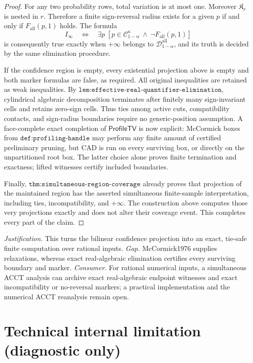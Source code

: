 \documentclass{article}
\begin{document}
\begin{proof}
For any two probability rows, total variation is at most one.  Moreover \(\mathfrak K_r\) is nested in \(r\).  Therefore a finite sign-reversal radius exists for a given \(p\) if and only if \(F_{\mathrm{all}}(p,1)\) holds.  The formula
\[
 I_{\infty}\quad\Longleftrightarrow\quad
 \exists p\;[p\in\mathcal C_{1-\alpha}^{\kappa}\ \wedge\ 
 \neg F_{\mathrm{all}}(p,1)]
\]
is consequently true exactly when \(+\infty\) belongs to \(\mathcal D_{1-\alpha}^{\mathrm{all}}\), and its truth is decided by the same elimination procedure.

If the confidence region is empty, every existential projection above is empty and both marker formulas are false, as required.  All original inequalities are retained as weak inequalities.  By \(\texttt{lem:effective-real-quantifier-elimination}\), cylindrical algebraic decomposition terminates after finitely many sign-invariant cells and retains zero-sign cells.  Thus ties among active cuts, compatibility contacts, and sign-radius boundaries require no generic-position assumption.  A face-complete exact completion of \(\mathsf{ProfileTV}\) is now explicit: McCormick boxes from \(\texttt{def:profiling-handle}\) may perform any finite amount of certified preliminary pruning, but CAD is run on every surviving box, or directly on the unpartitioned root box.  The latter choice alone proves finite termination and exactness; lifted witnesses certify included boundaries.

Finally, \(\texttt{thm:simultaneous-region-coverage}\) already proves that projection of the maintained region has the asserted simultaneous finite-sample interpretation, including ties, incompatibility, and \(+\infty\).  The construction above computes those very projections exactly and does not alter their coverage event.  This completes every part of the claim.
\end{proof}
\par\smallskip\noindent \textit{Justification.} This turns the bilinear confidence projection into an exact, tie-safe finite computation over rational inputs. \textit{Gap.} McCormick1976 supplies relaxations, whereas exact real-algebraic elimination certifies every surviving boundary and marker. \textit{Consumer.} For rational numerical inputs, a simultaneous ACCT analysis can archive exact real-algebraic endpoint witnesses and exact incompatibility or no-reversal markers; a practical implementation and the numerical ACCT reanalysis remain open.

\section*{Technical internal limitation (diagnostic only)}
\end{document}
